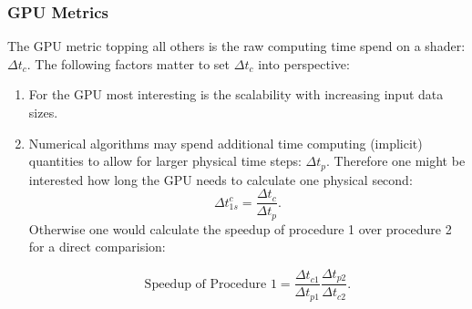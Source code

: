 \documentclass[m,times]{cgMA}
\begin{document}
\subsubsection{GPU Metrics}\label{sec:metrics}
The GPU metric topping all others is the raw computing time spend on a shader: $\Delta t_c$. The following factors matter to set $\Delta t_c$ into perspective:
\begin{enumerate}
  \item For the GPU most interesting is the scalability with increasing input data sizes.
  \item \label{it:speedup}Numerical algorithms may spend additional time computing (implicit) quantities to allow for larger physical time steps: $\Delta t_p$. Therefore one might be interested how long the GPU needs to calculate one physical second:
    \begin{equation}
    \Delta t^c_{1s} = \frac{\Delta t_c}{\Delta t_p}.
    \end{equation}
    Otherwise one would calculate the speedup of procedure 1 over procedure 2 for a direct comparision:

    \begin{equation}
      \text{Speedup of Procedure 1} = \frac{\Delta t_{c1}}{\Delta t_{p1}} \frac{\Delta t_{p2}}{\Delta t_{c2}}.
    \end{equation}
\end{enumerate}
\end{document}

